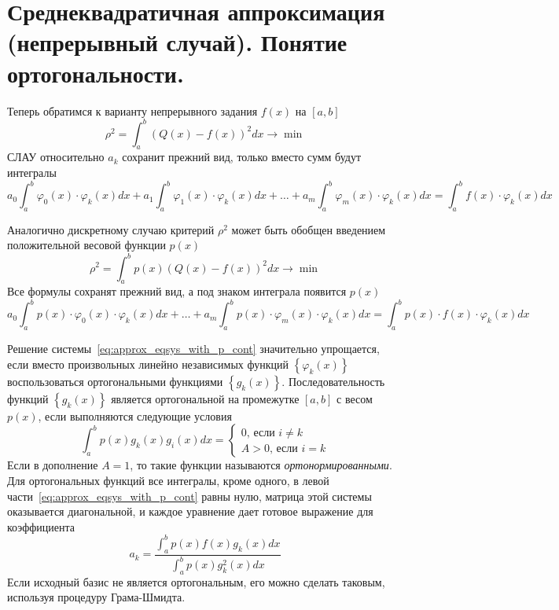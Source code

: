 \section{Среднеквадратичная аппроксимация (непрерывный случай). Понятие ортогональности.}\label{sec:ch14}
Теперь обратимся к варианту непрерывного задания $f(x)$ на $[a, b]$
\begin{equation}
    \rho^2 = \int_a^b \left( Q(x) - f(x) \right)^2 dx \rightarrow \min \label{eq:approx_continuity}
\end{equation}
СЛАУ относительно $a_k$ сохранит прежний вид, только вместо сумм будут интегралы
\begin{equation}
    a_0 \int_{a}^{b} \varphi_0 (x) \cdot \varphi_k (x) dx + a_1 \int_{a}^{b} \varphi_1 (x) \cdot \varphi_k (x) dx + \dots + a_m \int_{a}^{b} \varphi_m (x) \cdot \varphi_k (x) dx = \int_{a}^{b} f(x) \cdot \varphi_k (x) dx \label{eq:approx_eqsys_cont}
\end{equation}

Аналогично дискретному случаю критерий $\displaystyle \rho^2$ может быть обобщен введением положительной весовой функции
$p(x)$
\begin{equation}
    \rho^2 = \int_a^b p(x) \left( Q(x) - f(x) \right)^2 dx \rightarrow \min \label{eq:approx_with_p_cont}
\end{equation}
Все формулы сохранят прежний вид, а под знаком интеграла появится $p(x)$
\begin{equation}
    a_0 \int_{a}^{b} p(x) \cdot \varphi_0 (x) \cdot \varphi_k (x) dx + \dots + a_m \int_{a}^{b} p(x) \cdot \varphi_m (x) \cdot \varphi_k (x) dx = \int_{a}^{b} p(x) \cdot f(x) \cdot \varphi_k (x) dx \label{eq:approx_eqsys_with_p_cont}
\end{equation}

Решение системы~\eqref{eq:approx_eqsys_with_p_cont} значительно упрощается, если вместо произвольных линейно независимых
функций $\left\{ \varphi_k (x) \right\}$ воспользоваться ортогональными функциями $\left\{ g_k(x) \right\}$. Последовательность
функций $\left\{ g_k(x) \right\}$ является ортогональной на промежутке $[a, b]$ с весом $p(x)$, если выполняются следующие
условия
\begin{equation*}
    \int_{a}^{b} p(x)g_k(x)g_i(x)dx =
    \begin{cases}
        0\text{, если } i \neq k\\
        A > 0\text{, если } i = k
    \end{cases}
\end{equation*}
Если в дополнение $A = 1$, то такие функции называются \emph{ортонормированными}. Для ортогональных функций все
интегралы, кроме одного, в левой части~\eqref{eq:approx_eqsys_with_p_cont} равны нулю, матрица этой системы оказывается
диагональной, и каждое уравнение дает готовое выражение для коэффициента
\begin{equation}
    a_k = \frac{\displaystyle \int_{a}^{b} p(x)f(x)g_k(x)dx}{\displaystyle \int_{a}^{b} p(x)g_k^2(x)dx}
\end{equation}
Если исходный базис не является ортогональным, его можно сделать таковым, используя процедуру Грама-Шмидта.
